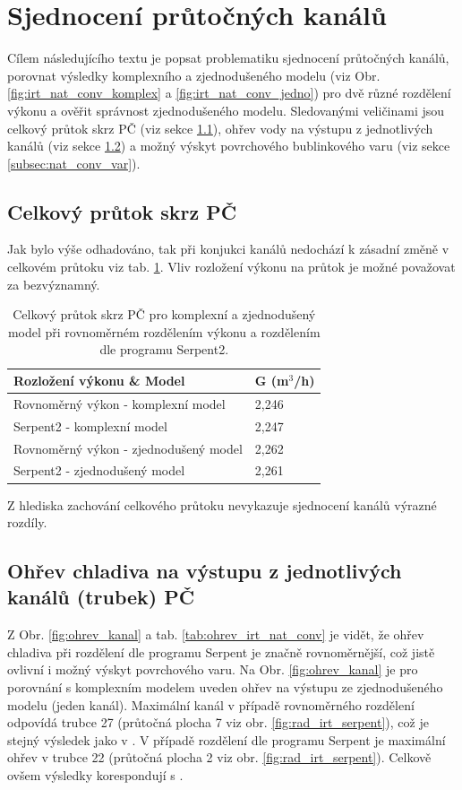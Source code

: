 
\section{Sjednocení průtočných kanálů}
\label{sec:termohydraulicky_model_IRT}
Cílem následujícího textu je popsat problematiku sjednocení průtočných kanálů, porovnat výsledky komplexního a zjednodušeného modelu (viz Obr. \ref{fig:irt_nat_conv_komplex} a \ref{fig:irt_nat_conv_jedno}) pro dvě různé rozdělení výkonu a ověřit správnost zjednodušeného modelu. Sledovanými veličinami jsou celkový průtok skrz PČ (viz sekce \ref{subsec:nat_conv_prutok}), ohřev vody na výstupu z jednotlivých kanálů (viz sekce \ref{subsec:nat_conv_ohrev}) a možný výskyt povrchového bublinkového varu (viz sekce \ref{subsec:nat_conv_var}). 
\subsection{Celkový průtok skrz PČ}
\label{subsec:nat_conv_prutok}
Jak bylo výše odhadováno, tak při konjukci kanálů nedochází k zásadní změně v celkovém průtoku viz tab. \ref{tab:prutok_irt_nat_conv}. Vliv rozložení výkonu na průtok je možné považovat za bezvýznamný. 
\begin{table}[H]
	\centering
	\caption{Celkový průtok skrz PČ pro komplexní a zjednodušený model při rovnoměrném rozdělením výkonu a rozdělením dle programu Serpent2.}
	\label{tab:prutok_irt_nat_conv}
	\begin{tabular}{ll}
		\hline
		Rozložení výkonu \& Model & G (m$^3$/h) \\ \hline
		Rovnoměrný výkon - komplexní model      & 2,246 \\
		Serpent2 - komplexní model       & 2,247 \\
		Rovnoměrný výkon - zjednodušený model & 2,262 \\
		Serpent2 - zjednodušený model & 2,261 \\ \hline
	\end{tabular}
\end{table}
Z hlediska zachování celkového průtoku nevykazuje sjednocení kanálů výrazné rozdíly.

\subsection{Ohřev chladiva na výstupu z jednotlivých kanálů (trubek) PČ}
\label{subsec:nat_conv_ohrev}
Z Obr. \ref{fig:ohrev_kanal} a tab. \ref{tab:ohrev_irt_nat_conv} je vidět, že ohřev chladiva při rozdělení dle programu Serpent je značně rovnoměrnější, což jistě ovlivní i možný výskyt povrchového varu. Na Obr. \ref{fig:ohrev_kanal} je pro porovnání s komplexním modelem uveden ohřev na výstupu ze zjednodušeného modelu (jeden kanál). Maximální kanál v případě rovnoměrného rozdělení odpovídá trubce 27 (průtočná plocha 7 viz obr. \ref{fig:rad_irt_serpent}), což je stejný výsledek jako v \cite{fejt}. V případě rozdělení dle programu Serpent je maximální ohřev v trubce 22 (průtočná plocha 2 viz obr. \ref{fig:rad_irt_serpent}). Celkově ovšem výsledky korespondují s \cite{fejt}.


